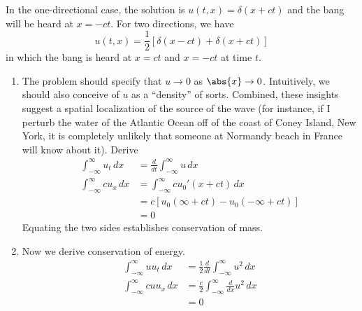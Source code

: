 \documentclass[a4paper]{article}
\begin{document}
In the one-directional case, the solution is \( u \!\left( t,x \right) = \delta \!\left( x + ct \right) \) and the bang will be heard at \( x = -ct \). For two directions, we have
\[
	u \!\left( t,x \right) = \frac{1}{2} \!\left[ \delta \!\left( x - ct \right) + \delta \!\left( x + ct \right) \right]
\]
in which the bang is heard at \( x = ct \) and \( x = -ct \) at time \( t \).

\vspace{12pt}

\begin{enumerate}[label=(\alph*)]
	\item The problem should specify that \( u \rightarrow 0 \) as \( \abs{x} \rightarrow 0 \). Intuitively, we should also conceive of \( u \) as a ``density'' of sorts. Combined, these insights suggest a spatial localization of the source of the wave (for instance, if I perturb the water of the Atlantic Ocean off of the coast of Coney Island, New York, it is completely unlikely that someone at Normandy beach in France will know about it). Derive
		\begin{align*}
			\int^{\infty}_{-\infty} u_{t} \, dx & = \frac{d }{d t} \int^{\infty}_{-\infty} u \, dx \\
			\int^{\infty}_{-\infty} cu_{x} \, dx & = \int^{\infty}_{-\infty} cu_{0}'\!\left( x + ct \right) \, dx \\
							     & = c \!\left[ u_{0}\!\left( \infty + ct \right) - u_{0}\!\left( -\infty + ct \right) \right] \\
							     & = 0
		\end{align*}
		Equating the two sides establishes conservation of mass.
	\item Now we derive conservation of energy.
		\begin{align*}
			\int^{\infty}_{-\infty} uu_{t} \, dx & = \frac{1}{2} \frac{d }{d t} \int^{\infty}_{-\infty} u^{2} \, dx \\
			\int^{\infty}_{-\infty} cuu_{x} \, dx & = \frac{c}{2} \int^{\infty}_{-\infty} \frac{d }{d x} u^{2} \, dx \\
							      & = 0
		\end{align*}
\end{enumerate}
\end{document}
